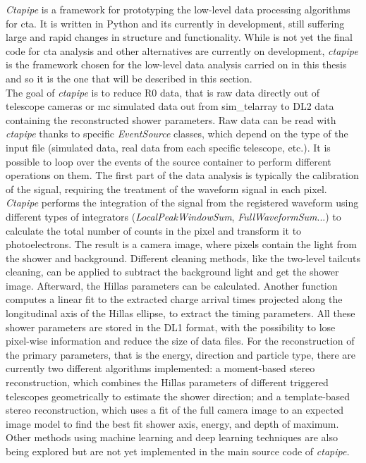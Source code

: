 \documentclass[main.tex]{subfiles}
\begin{document}
\textit{Ctapipe} \cite{ctapipe} is a framework for prototyping the low-level data processing algorithms for \gls{cta}. It is written in Python and its currently in development, still suffering large and rapid changes in structure and functionality. While is not yet the final code for \gls{cta} analysis and other alternatives are currently on development, \textit{ctapipe} is the framework chosen for the low-level data analysis carried on in this thesis and so it is the one that will be described in this section.\\
The goal of \textit{ctapipe} is to reduce R0 data, that is raw data directly out of telescope cameras or \gls{mc} simulated data out from sim\_telarray to DL2 data containing the reconstructed shower parameters.
Raw data can be read with \textit{ctapipe} thanks to specific \textit{EventSource} classes, which depend on the type of the input file (simulated data, real data from each specific telescope, etc.). It is possible to loop over the events of the source container to perform different operations on them. The first part of the data analysis is typically the calibration of the signal, requiring the treatment of the waveform signal in each pixel. \textit{Ctapipe} performs the integration of the signal from the registered waveform using different types of integrators (\textit{LocalPeakWindowSum}, \textit{FullWaveformSum}...) to calculate the total number of counts in the pixel and transform it to photoelectrons. The result is a camera image, where pixels contain the light from the shower and background. Different cleaning methods, like the two-level tailcuts cleaning, can be applied to subtract the background light and get the shower image. Afterward, the Hillas parameters can be calculated. Another function computes a linear fit to the extracted charge arrival times projected along the longitudinal axis of the Hillas ellipse, to extract the timing parameters. All these shower parameters are stored in the DL1 format, with the possibility to lose pixel-wise information and reduce the size of data files. For the reconstruction of the primary parameters, that is the energy, direction and particle type, there are currently two different algorithms implemented: a moment-based stereo reconstruction, which combines the Hillas parameters of different triggered telescopes geometrically to estimate the shower direction; and a template-based stereo reconstruction, which uses a fit of the full camera image to an expected image model to find the best fit shower axis, energy, and depth of maximum. Other methods using machine learning and deep learning techniques are also being explored but are not yet implemented in the main source code of \textit{ctapipe.}\\
\end{document}
